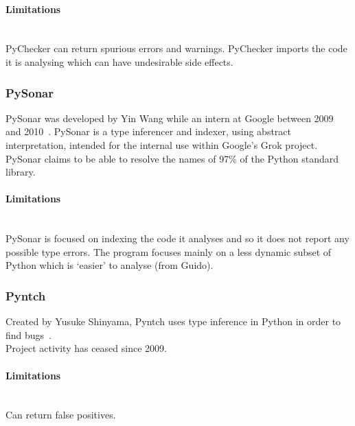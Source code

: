 \documentclass[12pt, titlepage]{article}
\begin{document}
\paragraph{Limitations}\mbox{}\\
PyChecker can return spurious errors and warnings. PyChecker imports the code it is analysing which can have undesirable side effects.

\subsubsection{PySonar}
PySonar was developed by Yin Wang while an intern at Google between 2009 and 2010~\cite{pySonar}. PySonar is a type inferencer and indexer, using abstract interpretation, intended for the internal use within Google's Grok project. PySonar claims to be able to resolve the names of 97\% of the Python standard library.
\paragraph{Limitations}\mbox{}\\
PySonar is focused on indexing the code it analyses and so it does not report any possible type errors. The program focuses mainly on a less dynamic subset of Python which is `easier' to analyse (from Guido).
\subsubsection{Pyntch}
Created by Yusuke Shinyama, Pyntch uses type inference in Python in order to find bugs~\cite{pyntch}. \\
Project activity has ceased since 2009.
\paragraph{Limitations}\mbox{}\\
Can return false positives.

\end{document}

